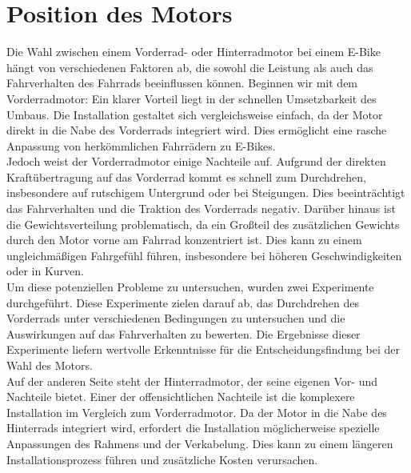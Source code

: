 


\section{Position des Motors}
Die Wahl zwischen einem Vorderrad- oder Hinterradmotor bei einem E-Bike hängt von verschiedenen Faktoren ab, die sowohl die Leistung als auch das Fahrverhalten des Fahrrads beeinflussen können.
Beginnen wir mit dem Vorderradmotor: Ein klarer Vorteil liegt in der schnellen Umsetzbarkeit des Umbaus.
Die Installation gestaltet sich vergleichsweise einfach, da der Motor direkt in die Nabe des Vorderrads integriert wird.
Dies ermöglicht eine rasche Anpassung von herkömmlichen Fahrrädern zu E-Bikes.\\

Jedoch weist der Vorderradmotor einige Nachteile auf.
Aufgrund der direkten Kraftübertragung auf das Vorderrad kommt es schnell zum Durchdrehen, insbesondere auf rutschigem Untergrund oder bei Steigungen.
Dies beeinträchtigt das Fahrverhalten und die Traktion des Vorderrads negativ.
Darüber hinaus ist die Gewichtsverteilung problematisch, da ein Großteil des zusätzlichen Gewichts durch den Motor vorne am Fahrrad konzentriert ist.
Dies kann zu einem ungleichmäßigen Fahrgefühl führen, insbesondere bei höheren Geschwindigkeiten oder in Kurven.\\

Um diese potenziellen Probleme zu untersuchen, wurden zwei Experimente durchgeführt.
Diese Experimente zielen darauf ab, das Durchdrehen des Vorderrads unter verschiedenen Bedingungen zu untersuchen und die Auswirkungen auf das Fahrverhalten zu bewerten.
Die Ergebnisse dieser Experimente liefern wertvolle Erkenntnisse für die Entscheidungsfindung bei der Wahl des Motors.\\

Auf der anderen Seite steht der Hinterradmotor, der seine eigenen Vor- und Nachteile bietet.
Einer der offensichtlichen Nachteile ist die komplexere Installation im Vergleich zum Vorderradmotor.
Da der Motor in die Nabe des Hinterrads integriert wird, erfordert die Installation möglicherweise spezielle Anpassungen des Rahmens und der Verkabelung.
Dies kann zu einem längeren Installationsprozess führen und zusätzliche Kosten verursachen.\\

